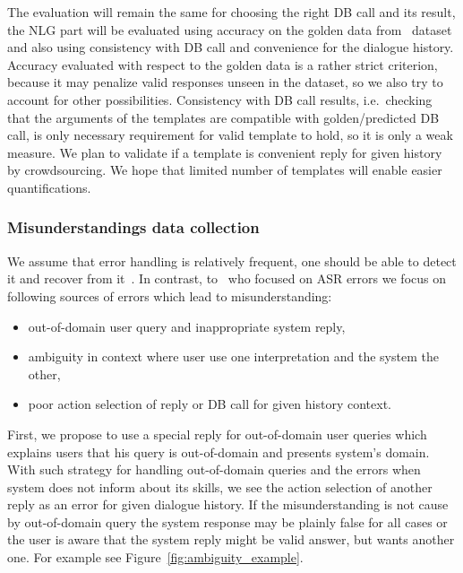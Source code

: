\documentclass[11pt]{article}
\begin{document}
The evaluation will remain the same for choosing the right DB call and its result, the NLG part will be evaluated using accuracy on the golden data from~\cite{platek2016wochat} dataset and also using consistency with DB call and convenience for the dialogue history.
Accuracy evaluated with respect to the golden data is a rather strict criterion, because it may penalize valid responses unseen in the dataset, so we also try to account for other possibilities.
Consistency with DB call results, i.e.\ checking that the arguments of the templates are compatible with golden/predicted DB call, is only necessary requirement for valid template to hold, so it is only a weak measure.
We plan to validate if a template is convenient reply for given history by crowdsourcing.
We hope that limited number of templates will enable easier quantifications.

\subsubsection*{Misunderstandings data collection}
We assume that error handling is relatively frequent, one should be able to detect it and recover from it~\cite{skantze_error_2007}.
In contrast, to~\cite{skantze_error_2007} who focused on ASR errors we focus on following sources of errors which lead to misunderstanding:
\begin{itemize}
    \item out-of-domain user query and inappropriate system reply,
    \item ambiguity in context where user use one interpretation and the system the other,
    \item poor action selection of reply or DB call for given history context.
\end{itemize}
First, we propose to use a special reply for out-of-domain user queries which explains users that his query is out-of-domain and presents system's domain.~\cite{platek_self_2015}
With such strategy for handling out-of-domain queries and the errors when system does not inform about its skills, we see the action selection of another reply as an error for given dialogue history.
If the misunderstanding is not cause by out-of-domain query the system response may be plainly false for all cases or the user is aware that the system reply might be valid answer, but wants another one.
For example see Figure~\ref{fig:ambiguity_example}.
\end{document}
